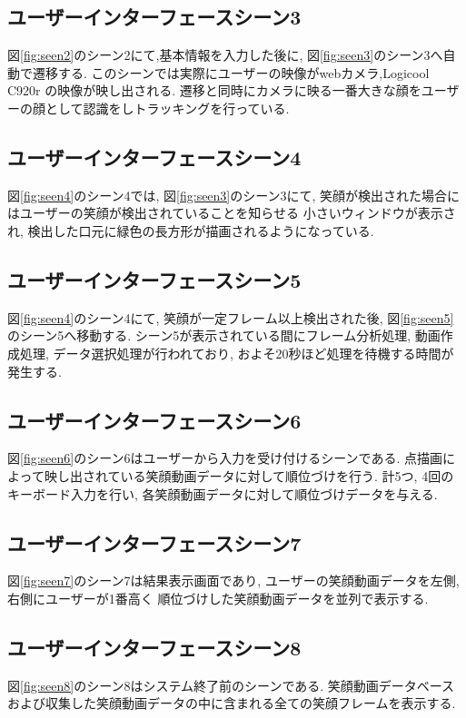 \subsection{ユーザーインターフェースシーン3}
図\ref{fig:seen2}のシーン2にて,基本情報を入力した後に, 図\ref{fig:seen3}のシーン3へ自動で遷移する.
このシーンでは実際にユーザーの映像がwebカメラ,Logicool C920r の映像が映し出される.
遷移と同時にカメラに映る一番大きな顔をユーザーの顔として認識をしトラッキングを行っている.

\subsection{ユーザーインターフェースシーン4}
図\ref{fig:seen4}のシーン4では, 図\ref{fig:seen3}のシーン3にて, 笑顔が検出された場合にはユーザーの笑顔が検出されていることを知らせる
小さいウィンドウが表示され, 検出した口元に緑色の長方形が描画されるようになっている.

\subsection{ユーザーインターフェースシーン5}
図\ref{fig:seen4}のシーン4にて, 笑顔が一定フレーム以上検出された後, 図\ref{fig:seen5} のシーン5へ移動する.
シーン5が表示されている間にフレーム分析処理, 動画作成処理, データ選択処理が行われており,
およそ20秒ほど処理を待機する時間が発生する.

\subsection{ユーザーインターフェースシーン6}
図\ref{fig:seen6}のシーン6はユーザーから入力を受け付けるシーンである.
点描画によって映し出されている笑顔動画データに対して順位づけを行う.
計5つ, 4回のキーボード入力を行い, 各笑顔動画データに対して順位づけデータを与える.

\subsection{ユーザーインターフェースシーン7}
図\ref{fig:seen7}のシーン7は結果表示画面であり, ユーザーの笑顔動画データを左側, 右側にユーザーが1番高く
順位づけした笑顔動画データを並列で表示する.

\subsection{ユーザーインターフェースシーン8}
図\ref{fig:seen8}のシーン8はシステム終了前のシーンである.
笑顔動画データベースおよび収集した笑顔動画データの中に含まれる全ての笑顔フレームを表示する.


